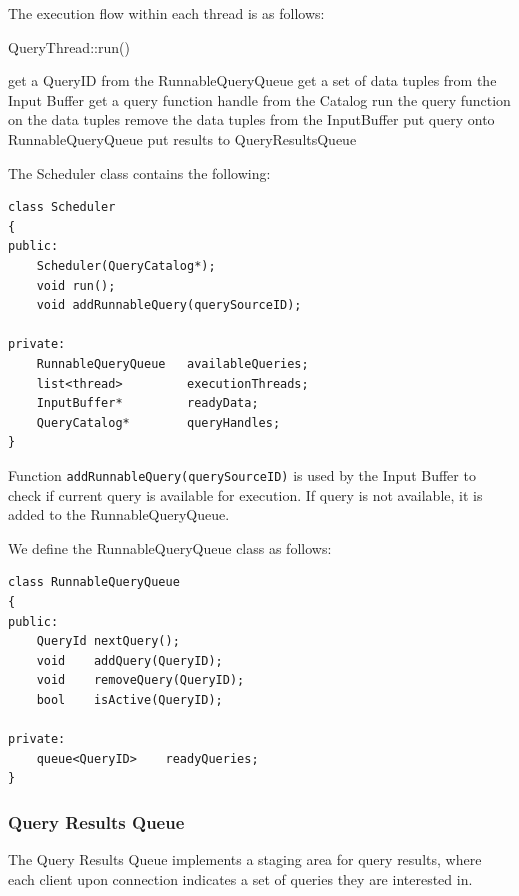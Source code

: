 \documentclass[14pt]{article}
\newcommand{\preliminary}[1]{\textcolor{prelim}{#1}}
\begin{document}
\noindent The execution flow within each thread is as follows:

\begin{algorithm}
\caption{QueryThread::run()}
\begin{algorithmic}
\LOOP
    \STATE get a QueryID from the RunnableQueryQueue
    \STATE get a set of data tuples from the Input Buffer
    \STATE get a query function handle from the Catalog
    \STATE run the query function on the data tuples
    \STATE remove the data tuples from the InputBuffer
        \STATE put query onto RunnableQueryQueue
    \ENDIF
    \STATE put results to QueryResultsQueue
\ENDLOOP
\end{algorithmic}
\end{algorithm}

\noindent The Scheduler class contains the following:

\begin{Verbatim}
class Scheduler
{
public:
    Scheduler(QueryCatalog*);
    void run();
    void addRunnableQuery(querySourceID);

private:
    RunnableQueryQueue   availableQueries;
    list<thread>         executionThreads;
    InputBuffer*         readyData;
    QueryCatalog*        queryHandles;
}
\end{Verbatim}

Function {\tt addRunnableQuery(querySourceID)} is used by the Input Buffer to check
if current query is available for execution. If query is not available, it is added
to the RunnableQueryQueue.

\noindent We define the RunnableQueryQueue class as follows:

\begin{Verbatim}
class RunnableQueryQueue
{
public:
    QueryId nextQuery();
    void    addQuery(QueryID);
    void    removeQuery(QueryID);
    bool    isActive(QueryID);

private:
    queue<QueryID>    readyQueries;
}
\end{Verbatim}


\subsubsection{Query Results Queue}

\preliminary{
The Query Results Queue implements a staging area for query results, where each
client upon connection indicates a set of queries they are interested in.
}
\end{document}
